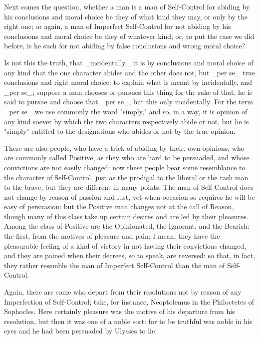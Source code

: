 Next comes the question, whether a man is a man of Self-Control for
abiding by his conclusions and moral choice be they of what kind they
may, or only by the right one; or again, a man of Imperfect Self-Control
for not abiding by his conclusions and moral choice be they of whatever
kind; or, to put the case we did before, is he such for not abiding by
false conclusions and wrong moral choice?

Is not this the truth, that _incidentally_ it is by conclusions and
moral choice of any kind that the one character abides and the other
does not, but _per se_ true conclusions and right moral choice: to
explain what is meant by incidentally, and _per se_; suppose a man
chooses or pursues this thing for the sake of that, he is said to pursue
and choose that _per se_, but this only incidentally. For the term _per
se_ we use commonly the word "simply," and so, in a way, it is opinion
of any kind soever by which the two characters respectively abide or
not, but he is "simply" entitled to the designations who abides or not
by the true opinion.

There are also people, who have a trick of abiding by their, own
opinions, who are commonly called Positive, as they who are hard to
be persuaded, and whose convictions are not easily changed: now these
people bear some resemblance to the character of Self-Control, just as
the prodigal to the liberal or the rash man to the brave, but they are
different in many points. The man of Self-Control does not change by
reason of passion and lust, yet when occasion so requires he will be
easy of persuasion: but the Positive man changes not at the call of
Reason, though many of this class take up certain desires and are led by
their pleasures. Among the class of Positive are the Opinionated, the
Ignorant, and the Bearish: the first, from the motives of pleasure and
pain: I mean, they have the pleasurable feeling of a kind of victory in
not having their convictions changed, and they are pained when their
decrees, so to speak, are reversed: so that, in fact, they rather
resemble the man of Imperfect Self-Control than the man of Self-Control.

Again, there are some who depart from their resolutions not by reason of
any Imperfection of Self-Control; take, for instance, Neoptolemus in the
Philoctetes of Sophocles. Here certainly pleasure was the motive of his
departure from his resolution, but then it was one of a noble sort:
for to be truthful was noble in his eyes and he had been persuaded by
Ulysses to lie.

